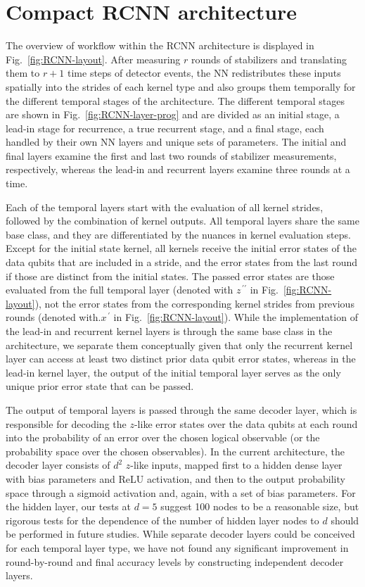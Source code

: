 \section{Compact RCNN architecture}
\label{sec:rcnn}

The overview of workflow within the RCNN architecture is displayed in Fig.~\ref{fig:RCNN-layout}. After measuring $r$ rounds of stabilizers and translating them to $r+1$ time steps of detector events, the NN redistributes these inputs spatially into the strides of each kernel type and also groups them temporally for the different temporal stages of the architecture. The different temporal stages are shown in Fig.~\ref{fig:RCNN-layer-prog} and are divided as an initial stage, a lead-in stage for recurrence, a true recurrent stage, and a final stage, each handled by their own NN layers and unique sets of parameters. The initial and final layers examine the first and last two rounds of stabilizer measurements, respectively, whereas the lead-in and recurrent layers examine three rounds at a time.

Each of the temporal layers start with the evaluation of all kernel strides, followed by the combination of kernel outputs. All temporal layers share the same base class, and they are differentiated by the nuances in kernel evaluation steps. Except for the initial state kernel, all kernels receive the initial error states of the data qubits that are included in a stride, and the error states from the last round if those are distinct from the initial states. The passed error states are those evaluated from the full temporal layer (denoted with $z^{\,\prime\prime}$ in Fig.~\ref{fig:RCNN-layout}), not the error states from the corresponding kernel strides from previous rounds (denoted with.$x^{\,\prime}$ in Fig.~\ref{fig:RCNN-layout}). While the implementation of the lead-in and recurrent kernel layers is through the same base class in the architecture, we separate them conceptually given that only the recurrent kernel layer can access at least two distinct prior data qubit error states, whereas in the lead-in kernel layer, the output of the initial temporal layer serves as the only unique prior error state that can be passed.

The output of temporal layers is passed through the same decoder layer, which is responsible for decoding the $z$-like error states over the data qubits at each round into the probability of an error over the chosen logical observable (or the probability space over the chosen observables). In the current architecture, the decoder layer consists of $d^2$ $z$-like inputs, mapped first to a hidden dense layer with bias parameters and ReLU activation, and then to the output probability space through a sigmoid activation and, again, with a set of bias parameters. For the hidden layer, our tests at $d=5$ suggest 100 nodes to be a reasonable size, but rigorous tests for the dependence of the number of hidden layer nodes to $d$ should be performed in future studies. While separate decoder layers could be conceived for each temporal layer type, we have not found any significant improvement in round-by-round and final accuracy levels by constructing independent decoder layers.

